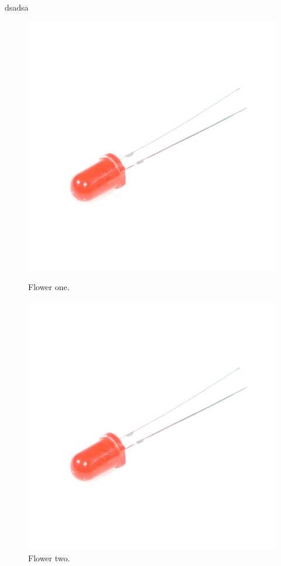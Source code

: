 dsadsa

\begin{figure}[h]
	\centering
	\begin{minipage}[b]{0.4\textwidth}
		\includegraphics[width=\textwidth]{img/hardware/led.jpg}
		\caption{Flower one.}
	\end{minipage}
	\hfill
	\begin{minipage}[b]{0.4\textwidth}
		\includegraphics[width=\textwidth]{img/hardware/led.jpg}
		\caption{Flower two.}
	\end{minipage}
\end{figure}




